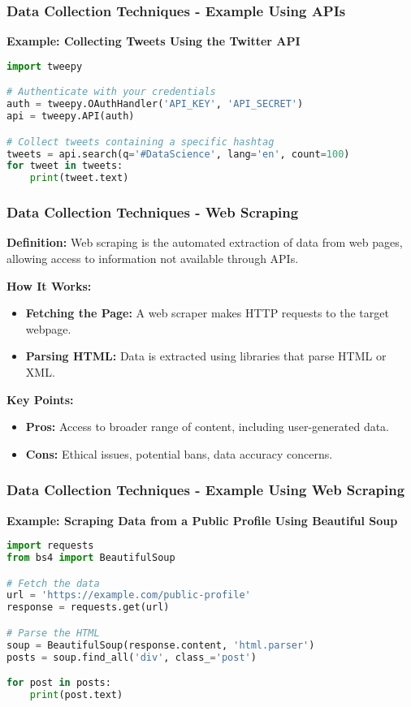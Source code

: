 \documentclass{beamer}
\begin{document}
\begin{frame}[fragile]
    \frametitle{Data Collection Techniques - Example Using APIs}
    \textbf{Example: Collecting Tweets Using the Twitter API}

    \begin{lstlisting}[language=Python]
import tweepy

# Authenticate with your credentials
auth = tweepy.OAuthHandler('API_KEY', 'API_SECRET')
api = tweepy.API(auth)

# Collect tweets containing a specific hashtag
tweets = api.search(q='#DataScience', lang='en', count=100)
for tweet in tweets:
    print(tweet.text)
    \end{lstlisting}
\end{frame}

\begin{frame}[fragile]
    \frametitle{Data Collection Techniques - Web Scraping}
    
    \textbf{Definition:} Web scraping is the automated extraction of data from web pages, allowing access to information not available through APIs.
    
    \textbf{How It Works:}
    \begin{itemize}
        \item \textbf{Fetching the Page:} A web scraper makes HTTP requests to the target webpage.
        \item \textbf{Parsing HTML:} Data is extracted using libraries that parse HTML or XML.
    \end{itemize}

    \textbf{Key Points:}
    \begin{itemize}
        \item \textbf{Pros:} Access to broader range of content, including user-generated data.
        \item \textbf{Cons:} Ethical issues, potential bans, data accuracy concerns.
    \end{itemize}
\end{frame}

\begin{frame}[fragile]
    \frametitle{Data Collection Techniques - Example Using Web Scraping}
    \textbf{Example: Scraping Data from a Public Profile Using Beautiful Soup}

    \begin{lstlisting}[language=Python]
import requests
from bs4 import BeautifulSoup

# Fetch the data
url = 'https://example.com/public-profile'
response = requests.get(url)

# Parse the HTML
soup = BeautifulSoup(response.content, 'html.parser')
posts = soup.find_all('div', class_='post')

for post in posts:
    print(post.text)
    \end{lstlisting}
\end{frame}
\end{document}

